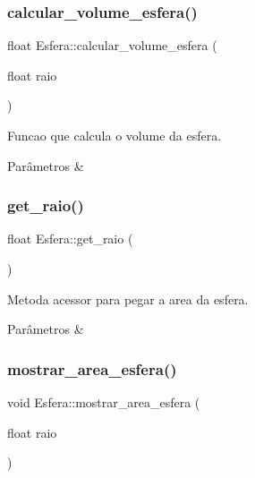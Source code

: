 \subsubsection{\texorpdfstring{calcular\+\_\+volume\+\_\+esfera()}{calcular\_volume\_esfera()}}
{\footnotesize\ttfamily float Esfera\+::calcular\+\_\+volume\+\_\+esfera (\begin{DoxyParamCaption}\item[{float}]{raio }\end{DoxyParamCaption})}



Funcao que calcula o volume da esfera. 


\begin{DoxyParams}{Parâmetros}
{\em } & \\
\hline
\end{DoxyParams}
\mbox{\label{classEsfera_aaae2727eec6f18ecbe6cd7168f9b50a8}} 
\subsubsection{\texorpdfstring{get\+\_\+raio()}{get\_raio()}}
{\footnotesize\ttfamily float Esfera\+::get\+\_\+raio (\begin{DoxyParamCaption}{ }\end{DoxyParamCaption})}



Metoda acessor para pegar a area da esfera. 


\begin{DoxyParams}{Parâmetros}
{\em } & \\
\hline
\end{DoxyParams}
\mbox{\label{classEsfera_a945ea5a121346cf305ee1e7a04d47b57}} 
\subsubsection{\texorpdfstring{mostrar\+\_\+area\+\_\+esfera()}{mostrar\_area\_esfera()}}
{\footnotesize\ttfamily void Esfera\+::mostrar\+\_\+area\+\_\+esfera (\begin{DoxyParamCaption}\item[{float}]{raio }\end{DoxyParamCaption})}



